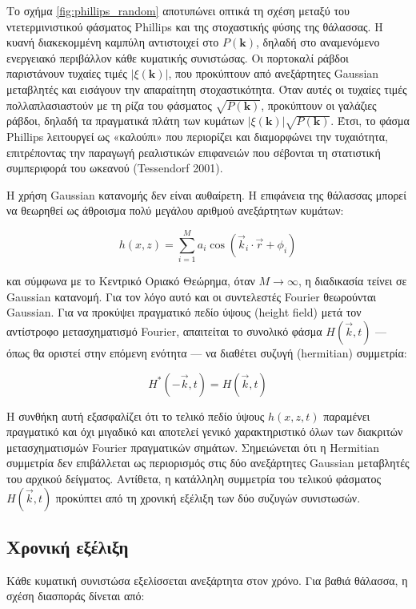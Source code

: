 Το σχήμα \ref{fig:phillips_random} αποτυπώνει οπτικά τη σχέση μεταξύ του
ντετερμινιστικού φάσματος Phillips και της στοχαστικής φύσης της
θάλασσας. Η κυανή διακεκομμένη καμπύλη αντιστοιχεί στο
\(P(\mathbf{k})\), δηλαδή στο αναμενόμενο ενεργειακό περιβάλλον κάθε
κυματικής συνιστώσας. Οι πορτοκαλί ράβδοι παριστάνουν τυχαίες τιμές
\(|\xi(\mathbf{k})|\), που προκύπτουν από ανεξάρτητες Gaussian
μεταβλητές και εισάγουν την απαραίτητη στοχαστικότητα. Όταν αυτές οι
τυχαίες τιμές πολλαπλασιαστούν με τη ρίζα του φάσματος
\(\sqrt{P(\mathbf{k})}\), προκύπτουν οι γαλάζιες ράβδοι, δηλαδή τα
πραγματικά πλάτη των κυμάτων \(|\xi(\mathbf{k})|\sqrt{P(\mathbf{k})}\).
Έτσι, το φάσμα Phillips λειτουργεί ως «καλούπι» που περιορίζει και
διαμορφώνει την τυχαιότητα, επιτρέποντας την παραγωγή ρεαλιστικών
επιφανειών που σέβονται τη στατιστική συμπεριφορά του ωκεανού
(Tessendorf 2001).

Η χρήση Gaussian κατανομής δεν είναι αυθαίρετη. Η επιφάνεια της θάλασσας
μπορεί να θεωρηθεί ως άθροισμα πολύ μεγάλου αριθμού ανεξάρτητων κυμάτων:

\[
h(x,z)
=
\sum_{i=1}^{M}
a_i
\cos(\vec{k}_i\cdot\vec{r}+\phi_i)
\]

και σύμφωνα με το Κεντρικό Οριακό Θεώρημα, όταν \(M \to \infty\), η
διαδικασία τείνει σε Gaussian κατανομή. Για τον λόγο αυτό και οι
συντελεστές Fourier θεωρούνται Gaussian. Για να προκύψει πραγματικό
πεδίο ύψους (height field) μετά τον αντίστροφο μετασχηματισμό Fourier,
απαιτείται το συνολικό φάσμα \(H(\vec{k},t)\) --- όπως θα οριστεί στην
επόμενη ενότητα --- να διαθέτει συζυγή (hermitian) συμμετρία:

\[
H^*(-\vec{k},t) = H(\vec{k},t)
\]

Η συνθήκη αυτή εξασφαλίζει ότι το τελικό πεδίο ύψους \(h(x,z,t)\)
παραμένει πραγματικό και όχι μιγαδικό και αποτελεί γενικό χαρακτηριστικό
όλων των διακριτών μετασχηματισμών Fourier πραγματικών σημάτων.
Σημειώνεται ότι η Hermitian συμμετρία δεν επιβάλλεται ως περιορισμός στις
δύο ανεξάρτητες Gaussian μεταβλητές του αρχικού δείγματος. Αντίθετα, η
κατάλληλη συμμετρία του τελικού φάσματος \(H(\vec{k},t)\) προκύπτει από
τη χρονική εξέλιξη των δύο συζυγών συνιστωσών.

\subsection{Χρονική
εξέλιξη}\label{ux3c7ux3c1ux3bfux3bdux3b9ux3baux3ae-ux3b5ux3beux3adux3bbux3b9ux3beux3b7}

Κάθε κυματική συνιστώσα εξελίσσεται ανεξάρτητα στον χρόνο. Για βαθιά
θάλασσα, η σχέση διασποράς δίνεται από:

